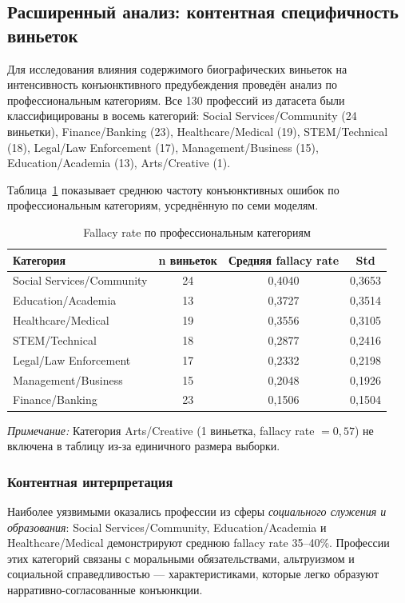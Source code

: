 \subsection{Расширенный анализ: контентная специфичность виньеток}

Для исследования влияния содержимого биографических виньеток на интенсивность конъюнктивного предубеждения проведён анализ по профессиональным категориям. Все 130 профессий из датасета были классифицированы в восемь категорий: Social Services/Community (24 виньетки), Finance/Banking (23), Healthcare/Medical (19), STEM/Technical (18), Legal/Law Enforcement (17), Management/Business (15), Education/Academia (13), Arts/Creative (1).

Таблица~\ref{tab:category_fallacy} показывает среднюю частоту конъюнктивных ошибок по профессиональным категориям, усреднённую по семи моделям.

\begin{table}[h!]
\caption{Fallacy rate по профессиональным категориям}
\label{tab:category_fallacy}
\centering
\begin{tabular}{|l|c|c|c|}
\hline
\textbf{Категория} & \textbf{n виньеток} & \textbf{Средняя fallacy rate} & \textbf{Std} \\
\hline
Social Services/Community & 24 & 0{,}4040 & 0{,}3653 \\
Education/Academia        & 13 & 0{,}3727 & 0{,}3514 \\
Healthcare/Medical        & 19 & 0{,}3556 & 0{,}3105 \\
STEM/Technical            & 18 & 0{,}2877 & 0{,}2416 \\
Legal/Law Enforcement     & 17 & 0{,}2332 & 0{,}2198 \\
Management/Business       & 15 & 0{,}2048 & 0{,}1926 \\
Finance/Banking           & 23 & 0{,}1506 & 0{,}1504 \\
\hline
\end{tabular}
\end{table}

\textit{Примечание:} Категория Arts/Creative (1 виньетка, fallacy rate $= 0{,}57$) не включена в таблицу из-за единичного размера выборки.

\subsubsection*{Контентная интерпретация}

Наиболее уязвимыми оказались профессии из сферы \textit{социального служения и образования}: Social Services/Community, Education/Academia и Healthcare/Medical демонстрируют среднюю fallacy rate 35--40\%. Профессии этих категорий связаны с моральными обязательствами, альтруизмом и социальной справедливостью --- характеристиками, которые легко образуют нарративно-согласованные конъюнкции.

